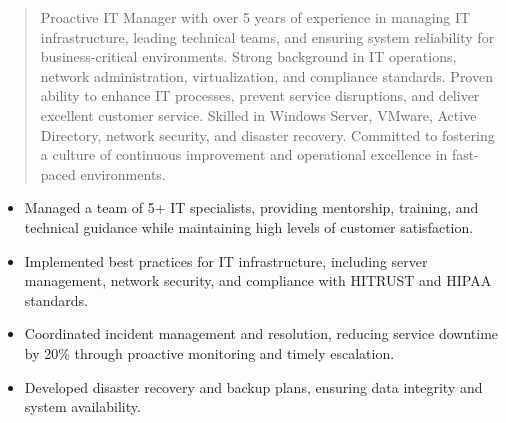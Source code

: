 



\makecvheader

\begin{quote}
  \noindent
  Proactive IT Manager with over 5 years of experience in managing IT infrastructure, leading technical teams, and ensuring system reliability for business-critical environments. Strong background in IT operations, network administration, virtualization, and compliance standards. Proven ability to enhance IT processes, prevent service disruptions, and deliver excellent customer service. Skilled in Windows Server, VMware, Active Directory, network security, and disaster recovery. Committed to fostering a culture of continuous improvement and operational excellence in fast-paced environments.
\end{quote}

\par\smallskip
\noindent
\begin{minipage}{20cm}
  \begin{minipage}{9.75cm}
    \begin{itemize}
      \item Managed a team of 5+ IT specialists, providing mentorship, training, and technical guidance while maintaining high levels of customer satisfaction.
      \item Implemented best practices for IT infrastructure, including server management, network security, and compliance with HITRUST and HIPAA standards.
    \end{itemize}
  \end{minipage}
  \hfill
  \begin{minipage}{9.75cm}
    \begin{itemize}
      \item Coordinated incident management and resolution, reducing service downtime by 20\% through proactive monitoring and timely escalation.
      \item Developed disaster recovery and backup plans, ensuring data integrity and system availability.
    \end{itemize}
  \end{minipage}
\end{minipage}
\par\smallskip
\divider

